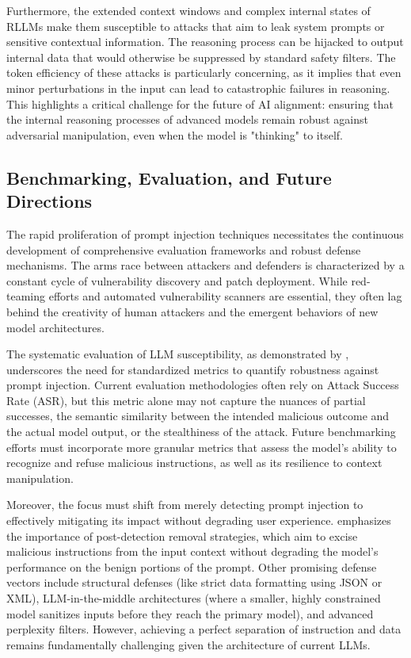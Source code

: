 \documentclass[11pt,a4paper]{article}
\begin{document}
Furthermore, the extended context windows and complex internal states of RLLMs make them susceptible to attacks that aim to leak system prompts or sensitive contextual information. The reasoning process can be hijacked to output internal data that would otherwise be suppressed by standard safety filters. The token efficiency of these attacks is particularly concerning, as it implies that even minor perturbations in the input can lead to catastrophic failures in reasoning. This highlights a critical challenge for the future of AI alignment: ensuring that the internal reasoning processes of advanced models remain robust against adversarial manipulation, even when the model is "thinking" to itself.

\subsection{Benchmarking, Evaluation, and Future Directions}
The rapid proliferation of prompt injection techniques necessitates the continuous development of comprehensive evaluation frameworks and robust defense mechanisms. The arms race between attackers and defenders is characterized by a constant cycle of vulnerability discovery and patch deployment. While red-teaming efforts and automated vulnerability scanners are essential, they often lag behind the creativity of human attackers and the emergent behaviors of new model architectures.

The systematic evaluation of LLM susceptibility, as demonstrated by \cite{Pathade_2025_LLMs}, underscores the need for standardized metrics to quantify robustness against prompt injection. Current evaluation methodologies often rely on Attack Success Rate (ASR), but this metric alone may not capture the nuances of partial successes, the semantic similarity between the intended malicious outcome and the actual model output, or the stealthiness of the attack. Future benchmarking efforts must incorporate more granular metrics that assess the model's ability to recognize and refuse malicious instructions, as well as its resilience to context manipulation.

Moreover, the focus must shift from merely detecting prompt injection to effectively mitigating its impact without degrading user experience. \cite{Chen_2025_Indirect} emphasizes the importance of post-detection removal strategies, which aim to excise malicious instructions from the input context without degrading the model's performance on the benign portions of the prompt. Other promising defense vectors include structural defenses (like strict data formatting using JSON or XML), LLM-in-the-middle architectures (where a smaller, highly constrained model sanitizes inputs before they reach the primary model), and advanced perplexity filters. However, achieving a perfect separation of instruction and data remains fundamentally challenging given the architecture of current LLMs.
\end{document}
